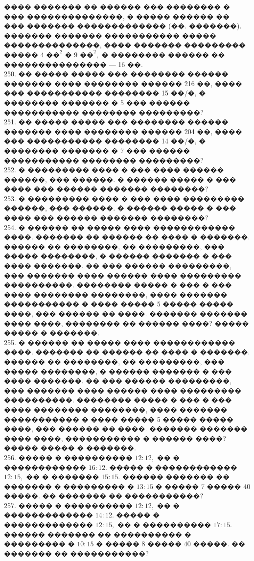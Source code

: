 \documentclass[12pt]{article}
\begin{document}
���� ������� �� ������ ��� �������� � ��� ��������������, � ����� ������ �� ��� ������� ������������� (��. �������). ������� �������  ����������� ����� ��������������, ���� ������� ��������� ����� $4\text{ ��}^2$ � $9\text{ ��}^2,$ � �������� ������ �� ��������������� --- 16 ��.\\
250. �� ����� ����� ��� �������� ������ ������� ���� �������� ������ 216 ��, ���� ��� ����������� �������� 15 ��/�, � �������� ������� � 5 ��� ������ ����������� �������� ���������?\\
251. �� ����� ����� ��� �������� ������ ������� ���� �������� ������ 204 ��, ���� ��� ����������� �������� 14 ��/�, � �������� ������� � 7 ��� ������ ����������� �������� ���������?\\
252. � ��������� ���� � ��� ���� ������ ������, ��� ������. � ������ ����� � ��� ���� ��� ������ ������� ��������?\\
253. � ��������� ���� � ��� ���� ��������� ������, ��� ������. � ������ ����� � ��� ���� ��� ������ ������� ��������?\\
254. � ������ �� ����� ���� ������������ ����. ������� �� ������ �� ���� � �������. ������ �� ��������, �� ���������, ��� ����� ��������, � ������ ������� � ��� ���� �������. �� ��� ������ ���������, ��� ������� ���� ������ ���� ��������� ����������. �������� ����� � ��� � ��� ���� �������� ��������, ���� ������� ����������� � ���� ����� 5 ����� ����� ����, ��� ������ �� ����. ������� ������� ���� ����, �������� �� ������ ����? ����� ����� � �������.\\
255. � ������ �� ����� ���� ������������ ����. ������� �� ������ �� ���� � �������. ������ �� ��������, �� ���������, ��� ����� ��������, � ������ ������� � ��� ���� �������. �� ��� ������ ���������, ��� ������� ���� ������ ���� ��������� ����������. �������� ����� � ��� � ��� ���� �������� ��������, ���� ������� ����������� � ���� ����� 5 ����� ����� ����, ��� ������ �� ����. ������� ������� ���� ����, ����������� � ������ ����? ����� ����� � �������.\\
256. ����� � ���������� $12:12,$ �� � ������������ $16:12.$ ����� � ������������ $12:15,$ �� � ������� $15:15.$ ������ ������� �� ������� � ��������� � $13:15$ � ����� 7 ����� 40 �����. �� ������� �� �����������?\\
257. ����� � ���������� $12:12,$ �� � ������������� $14:12.$ ����� � ������������� $12:15,$ �� � ���������� $17:15.$ ������ ������� �� ���������� � ��������� � $10:15$ � ����� 8 ����� 40 �����. �� ������� �� �����������?\\
\end{document}
